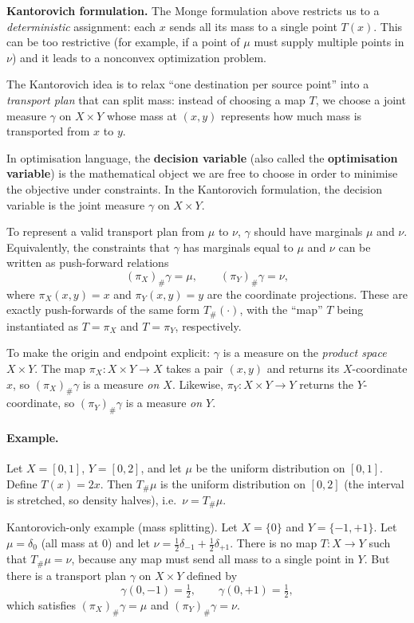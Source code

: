 \textbf{Kantorovich formulation.} The Monge formulation above restricts us to a \emph{deterministic} assignment:
each $x$ sends all its mass to a single point $T(x)$. This can be too restrictive (for example, if a point of $\mu$
must supply multiple points in $\nu$) and it leads to a nonconvex optimization problem.

The Kantorovich idea is to relax ``one destination per source point'' into a \emph{transport plan} that can split mass:
instead of choosing a map $T$, we choose a joint measure $\gamma$ on $X\times Y$ whose mass at $(x,y)$ represents
how much mass is transported from $x$ to $y$.

In optimisation language, the \textbf{decision variable} (also called the \textbf{optimisation variable}) is the
mathematical object we are free to choose in order to minimise the objective under constraints.
In the Kantorovich formulation, the decision variable is the joint measure $\gamma$ on $X\times Y$.

To represent a valid transport plan from $\mu$ to $\nu$, $\gamma$ should have marginals $\mu$ and $\nu$.
Equivalently, the constraints that $\gamma$ has marginals equal to $\mu$ and $\nu$ can be written as push-forward relations
$$
(\pi_X)_{\#}\gamma=\mu,\qquad (\pi_Y)_{\#}\gamma=\nu,
$$
where $\pi_X(x,y)=x$ and $\pi_Y(x,y)=y$ are the coordinate projections.
These are exactly push-forwards of the same form $T_{\#}(\cdot)$, with the ``map'' $T$ being instantiated as
$T=\pi_X$ and $T=\pi_Y$, respectively.

To make the origin and endpoint explicit: $\gamma$ is a measure on the \emph{product space} $X\times Y$.
The map $\pi_X:X\times Y\to X$ takes a pair $(x,y)$ and returns its $X$-coordinate $x$, so $(\pi_X)_{\#}\gamma$
is a measure \emph{on $X$}. Likewise, $\pi_Y:X\times Y\to Y$ returns the $Y$-coordinate, so $(\pi_Y)_{\#}\gamma$
is a measure \emph{on $Y$}.

\paragraph{Example.}
Let $X=[0,1]$, $Y=[0,2]$, and let $\mu$ be the uniform distribution on $[0,1]$. Define $T(x)=2x$.
Then $T_{\#}\mu$ is the uniform distribution on $[0,2]$ (the interval is stretched, so density halves), i.e.\ $\nu=T_{\#}\mu$.

Kantorovich-only example (mass splitting). Let $X=\{0\}$ and $Y=\{-1,+1\}$. Let $\mu=\delta_0$ (all mass at $0$) and
let $\nu=\tfrac12\delta_{-1}+\tfrac12\delta_{+1}$. There is no map $T:X\to Y$ such that $T_{\#}\mu=\nu$, because any map
must send all mass to a single point in $Y$. But there is a transport plan $\gamma$ on $X\times Y$ defined by
$$
\gamma(0,-1)=\tfrac12,\qquad \gamma(0,+1)=\tfrac12,
$$
which satisfies $(\pi_X)_{\#}\gamma=\mu$ and $(\pi_Y)_{\#}\gamma=\nu$.

